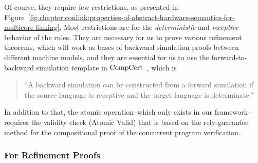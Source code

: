 Of course, they require few restrictions, as presented in Figure~\ref{fig:chapter:conlink:properties-of-abstract-hardware-semantics-for-multicore-linking}. 
Most restrictions are for the \textit{deterministic} and \textit{receptive} behavior of the rules.
They are necessary for us to prove various refinement theorems, which will work as bases of backward simulation proofs between different machine models, 
and they are essential for us to use the forward-to-backward simulation template in $\mathrm{CompCert}$~\cite{leroy06}, which is
\begin{quote}
``A backward simulation can be constructed from a forward
simulation if the source language is receptive and the target
language is determinate.''
\end{quote}
In addition to that, the atomic operation--which only exists 
in our framework--
requires the validity check (\textsf{Atomic Valid})
that is based on the rely-guarantee method for the compositional proof of the concurrent program verification.

\subsubsection{For Refinement Proofs}


